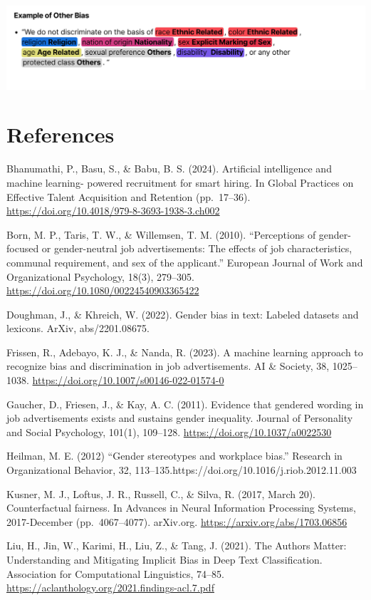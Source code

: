 \documentclass[
]{book}
\begin{document}
\includegraphics{images/Others.png}

\chapter{References}\label{references}

Bhanumathi, P., Basu, S., \& Babu, B. S. (2024). Artificial intelligence and machine learning- powered recruitment for smart hiring. In Global Practices on Effective Talent Acquisition and Retention (pp.~17--36). \url{https://doi.org/10.4018/979-8-3693-1938-3.ch002}

Born, M. P., Taris, T. W., \& Willemsen, T. M. (2010). ``Perceptions of gender-focused or gender-neutral job advertisements: The effects of job characteristics, communal requirement, and sex of the applicant.'' European Journal of Work and Organizational Psychology, 18(3), 279--305. \url{https://doi.org/10.1080/00224540903365422}

Doughman, J., \& Khreich, W. (2022). Gender bias in text: Labeled datasets and lexicons. ArXiv, abs/2201.08675.

Frissen, R., Adebayo, K. J., \& Nanda, R. (2023). A machine learning approach to recognize bias and discrimination in job advertisements. AI \& Society, 38, 1025--1038. \url{https://doi.org/10.1007/s00146-022-01574-0}

Gaucher, D., Friesen, J., \& Kay, A. C. (2011). Evidence that gendered wording in job advertisements exists and sustains gender inequality. Journal of Personality and Social Psychology, 101(1), 109--128. \url{https://doi.org/10.1037/a0022530}

Heilman, M. E. (2012) ``Gender stereotypes and workplace bias.'' Research in Organizational Behavior, 32, 113--135.https://doi.org/10.1016/j.riob.2012.11.003

Kusner, M. J., Loftus, J. R., Russell, C., \& Silva, R. (2017, March 20). Counterfactual fairness. In Advances in Neural Information Processing Systems, 2017-December (pp.~4067--4077). arXiv.org. \url{https://arxiv.org/abs/1703.06856}

Liu, H., Jin, W., Karimi, H., Liu, Z., \& Tang, J. (2021). The Authors Matter: Understanding and Mitigating Implicit Bias in Deep Text Classification. Association for Computational Linguistics, 74--85. \url{https://aclanthology.org/2021.findings-acl.7.pdf}
\end{document}

